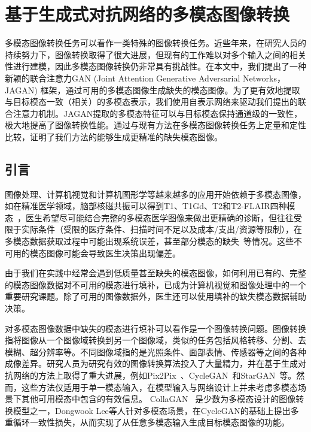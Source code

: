 \chapter{基于生成式对抗网络的多模态图像转换}

多模态图像转换任务可以看作一类特殊的图像转换任务。近些年来，在研究人员的持续努力下，图像转换取得了很大进展，但现有的工作难以对多个输入之间的相关性进行建模，因此多模态图像转换仍非常具有挑战性。在本文中，我们提出了一种新颖的联合注意力GAN (Joint Attention Generative Adversarial Networks，JAGAN) 框架，通过可用的多模态图像生成缺失的模态图像。为了更有效地提取与目标模态一致（相关）的多模态表示，我们使用自表示网络来驱动我们提出的联合注意力机制。JAGAN提取的多模态特征可以与目标模态保持通道级的一致性，极大地提高了图像转换性能。通过与现有方法在多模态图像转换任务上定量和定性比较，证明了我们方法的能够生成更精准的缺失模态图像。

\section{引言}

图像处理、计算机视觉和计算机图形学等越来越多的应用开始依赖于多模态图像，如在精准医学领域，脑部核磁共振可以得到T1、T1Gd、T2和T2-FLAIR四种模态~\cite{drevelegas2011imaging}，医生希望尽可能结合完整的多模态医学图像来做出更精确的诊断，但往往受限于实际条件（受限的医疗条件、扫描时间不足以及成本/支出/资源等限制），在多模态数据获取过程中可能出现系统误差，甚至部分模态的缺失~\cite{tanenbaum2017synthetic}等情况。这些不可用的模态图像可能会导致医生决策出现偏差。

由于我们在实践中经常会遇到低质量甚至缺失的模态图像，如何利用已有的、完整的模态图像数据对不可用的模态进行填补，已成为计算机视觉和图像处理中的一个重要研究课题。除了可用的图像数据外，医生还可以使用填补的缺失模态数据辅助决策。

对多模态图像数据中缺失的模态进行填补可以看作是一个图像转换问题。图像转换指将图像从一个图像域转换到另一个图像域，类似的任务包括风格转移、分割、去模糊、超分辨率等。不同图像域指的是光照条件、面部表情、传感器等之间的各种成像差异。研究人员为研究有效的图像转换算法投入了大量精力，并在基于生成对抗网络的方法上取得了重大进展，例如Pix2Pix~\cite{pix2pix}、CycleGAN~\cite{cyclegan}和StarGAN~\cite{stargan}等。然而，这些方法仅适用于单一模态输入，在模型输入与网络设计上并未考虑多模态场景下其他可用模态中包含的有效信息。 CollaGAN~\cite{collagan} 是少数为多模态设计的图像转换模型之一，Dongwook Lee等人针对多模态场景，在CycleGAN的基础上提出多重循环一致性损失，从而实现了从任意多模态输入生成目标模态图像的功能。

